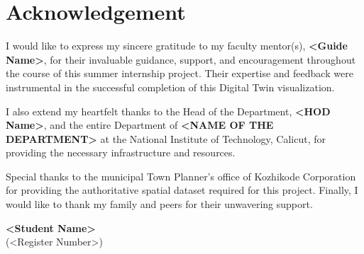 \chapter*{Acknowledgement}

I would like to express my sincere gratitude to my faculty mentor(s), \textbf{<Guide Name>}, for their invaluable guidance, support, and encouragement throughout the course of this summer internship project. Their expertise and feedback were instrumental in the successful completion of this Digital Twin visualization.

I also extend my heartfelt thanks to the Head of the Department, \textbf{<HOD Name>}, and the entire Department of \textbf{<NAME OF THE DEPARTMENT>} at the National Institute of Technology, Calicut, for providing the necessary infrastructure and resources.

Special thanks to the municipal Town Planner's office of Kozhikode Corporation for providing the authoritative spatial dataset required for this project. Finally, I would like to thank my family and peers for their unwavering support.

\vspace{2cm}
\begin{flushright}
\textbf{<Student Name>} \\
(<Register Number>)
\end{flushright}
\newpage
